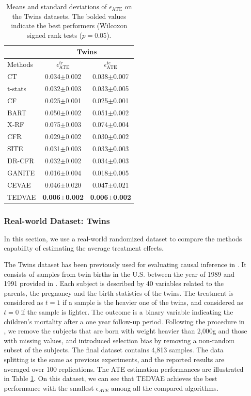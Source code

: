\documentclass[letterpaper]{article} %
\begin{document}
\begin{table}[!t]
\setlength{\tabcolsep}{4pt}
\centering
\begin{tabular}{l | c c}
\hline
&   \multicolumn{2}{c}{Twins} \\
\hline
Methods & $\epsilon_{\text{ATE}}^{tr}$ &  $\epsilon_{\text{ATE}}^{te}$  \\
\hline
CT &   0.034$\pm$0.002 & 0.038$\pm$0.007  \\
t-stats & 0.032$\pm$0.003 & 0.033$\pm$0.005\\
\hline
CF	 & 0.025$\pm$0.001 & 0.025$\pm$0.001 \\
BART  & 0.050$\pm$0.002 & 0.051$\pm$0.002\\
X-RF   & 0.075$\pm$0.003 & 0.074$\pm$0.004 \\
\hline
CFR	    & 0.029$\pm$0.002 & 0.030$\pm$0.002\\

SITE  & 0.031$\pm$0.003 & 0.033$\pm$0.003 \\
DR-CFR & 0.032$\pm$0.002 & 0.034$\pm$0.003 \\
\hline
GANITE & 0.016$\pm$0.004 & 0.018$\pm$0.005 \\
CEVAE   & 0.046$\pm$0.020 & 0.047$\pm$0.021 \\
TEDVAE  & \textbf{0.006$\pm$0.002}  & \textbf{0.006$\pm$0.002} \\
\hline
\end{tabular}
\label{ATE_results}
\caption{ Means and standard deviations of $\epsilon_{\text{ATE}}$ on the Twins datasets. The bolded values indicate the best performers (Wilcoxon signed rank tests ($p=0.05$). }
\end{table}

\subsubsection{Real-world Dataset: Twins}
In this section, we use a real-world randomized dataset to compare the methods capability of estimating the average treatment effects.


The Twins dataset has been previously used for evaluating causal inference in \cite{Louizos2017,Yao2018_Twin}. It consists of samples from twin births in the U.S. between the year of 1989 and 1991 provided in \cite{Almond2005_TwinData}. Each subject is described by 40 variables related to the parents, the pregnancy and the birth statistics of the twins.
The treatment is considered as $t=1$ if a sample is the heavier one of the twins, and considered as $t=0$ if the sample is lighter.
The outcome is a binary variable indicating the children's mortality after a one year follow-up period.
Following the procedure in \cite{Yao2018_Twin}, we remove the subjects that are born with weight heavier than 2,000g and those with missing values, and introduced selection bias by removing a non-random subset of the subjects. The final dataset contains 4,813 samples. The data splitting is the same as previous experiments, and the reported results are averaged over 100 replications.
The ATE estimation performances are illustrated in Table \ref{ATE_results}.
On this dataset, we can see that TEDVAE achieves the best performance with the smallest $\epsilon_{ATE}$ among all the compared algorithms.
\end{document}
